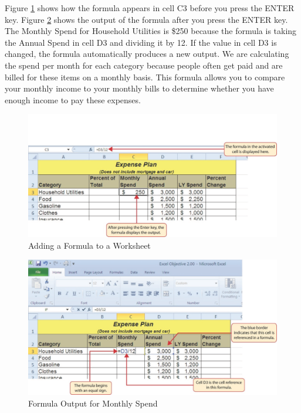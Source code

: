 Figure \ref{02:fig03} shows how the formula appears in cell \textsf{C3} before you press the ENTER key. Figure \ref{02:fig04} shows the output of the formula after you press the ENTER key. The Monthly Spend for Household Utilities is \$250 because the formula is taking the Annual Spend in cell \textsf{D3} and dividing it by 12. If the value in cell \textsf{D3} is changed, the formula automatically produces a new output. We are calculating the spend per month for each category because people often get paid and are billed for these items on a monthly basis. This formula allows you to compare your monthly income to your monthly bills to determine whether you have enough income to pay these expenses.

\begin{figure}[H]
	\centering
	\includegraphics[width=\maxwidth{.95\linewidth}]{gfx/ch02_fig03}
	\caption{Adding a Formula to a Worksheet}
	\label{02:fig03}
\end{figure}

\begin{figure}[H]
	\centering
	\includegraphics[width=\maxwidth{.95\linewidth}]{gfx/ch02_fig04}
	\caption{Formula Output for Monthly Spend}
	\label{02:fig04}
\end{figure}

